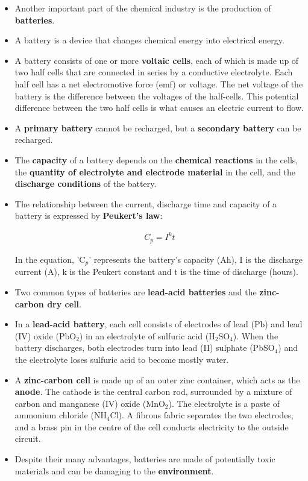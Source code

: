 \begin{itemize}
\item{Another important part of the chemical industry is the production of \textbf{batteries}.}
\item{A battery is a device that changes chemical energy into electrical energy.}
\item{A battery consists of one or more \textbf{voltaic cells}, each of which is made up of two half cells that are connected in series by a conductive electrolyte. Each half cell has a net electromotive force (emf) or voltage. The net voltage of the battery is the difference between the voltages of the half-cells. This potential difference between the two half cells is what causes an electric current to flow. }
\item{A \textbf{primary battery} cannot be recharged, but a \textbf{secondary battery} can be recharged.}
\item{The \textbf{capacity} of a battery depends on the \textbf{chemical reactions} in the cells, the \textbf{quantity of electrolyte and electrode material} in the cell, and the \textbf{discharge conditions} of the battery.}
\item{The relationship between the current, discharge time and capacity of a battery is expressed by \textbf{Peukert's law}:

\begin{eqnarray*}
C_{p} = I^{k}t
\end{eqnarray*}

In the equation, 'C$_{p}$' represents the battery's capacity (Ah), I is the discharge current (A), k is the Peukert constant and t is the time of discharge (hours).}
\item{Two common types of batteries are \textbf{lead-acid batteries} and the \textbf{zinc-carbon dry cell}.}
\item{In a \textbf{lead-acid battery}, each cell consists of electrodes of lead (Pb) and lead (IV) oxide (PbO$_{2}$) in an electrolyte of sulfuric acid (H$_{2}$SO$_{4}$). When the battery discharges, both electrodes turn into lead (II) sulphate (PbSO$_{4}$) and the electrolyte loses sulfuric acid to become mostly water.}
\item{A \textbf{zinc-carbon cell} is made up of an outer zinc container, which acts as the \textbf{anode}. The cathode is the central carbon rod, surrounded by a mixture of carbon and manganese (IV) oxide (MnO$_{2}$). The electrolyte is a paste of ammonium chloride (NH$_{4}$Cl). A fibrous fabric separates the two electrodes, and a brass pin in the centre of the cell conducts electricity to the outside circuit. }
\item{Despite their many advantages, batteries are made of potentially toxic materials and can be damaging to the \textbf{environment}.}
\end{itemize}

